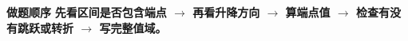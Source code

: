 \begin{explanationbox}
    \medskip
    \textbf{\textcolor{CExplanation}{做题顺序}}
    \textbf{先看区间是否包含端点 $\longrightarrow$ 再看升降方向
    $\longrightarrow$ 算端点值 $\longrightarrow$ 检查有没有跳跃或转折 $\longrightarrow$ 写完整值域。}
\end{explanationbox}
